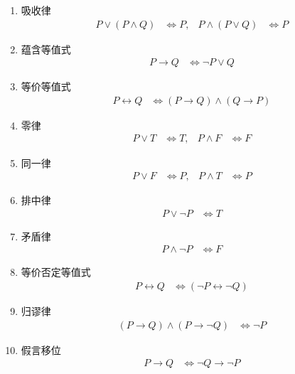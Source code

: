 \begin{enumerate}
    \item 吸收律
    \begin{align*}
        P \vee (P \wedge Q) &\Leftrightarrow P, &
        P \wedge (P \vee Q) &\Leftrightarrow P
    \end{align*}

    \item 蕴含等值式
    \begin{align*}
        P \to Q &\Leftrightarrow \neg P \vee Q
    \end{align*}

    \item 等价等值式
    \begin{align*}
        P \leftrightarrow Q &\Leftrightarrow (P \to Q) \wedge (Q \to P)
    \end{align*}

    \item 零律
    \begin{align*}
        P \vee T &\Leftrightarrow T, &
        P \wedge F &\Leftrightarrow F
    \end{align*}

    \item 同一律
    \begin{align*}
        P \vee F &\Leftrightarrow P, &
        P \wedge T &\Leftrightarrow P
    \end{align*}

    \item 排中律
    \begin{align*}
        P \vee \neg P &\Leftrightarrow T
    \end{align*}

    \item 矛盾律
    \begin{align*}
        P \wedge \neg P &\Leftrightarrow F
    \end{align*}

    \item 等价否定等值式
    \begin{align*}
        P \leftrightarrow Q &\Leftrightarrow (\neg P \leftrightarrow \neg Q)
    \end{align*}

    \item 归谬律
    \begin{align*}
        (P \to Q) \wedge (P \to \neg Q) &\Leftrightarrow \neg P
    \end{align*}

    \item 假言移位
    \begin{align*}
        P \to Q &\Leftrightarrow \neg Q \to \neg P
    \end{align*}
\end{enumerate}

